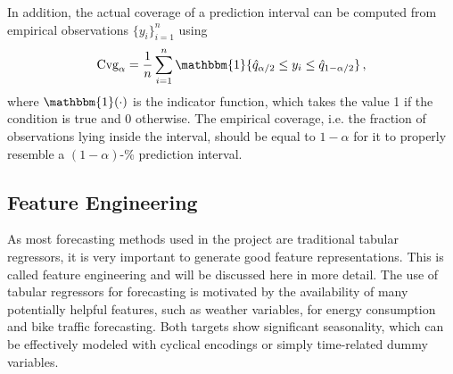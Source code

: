 In addition, the actual coverage of a prediction interval can be computed from empirical observations $\{y_i\}_{i=1}^{n}$ using
\begin{equation}
    \text{Cvg}_{\alpha} = \frac{1}{n} \sum_{i = 1}^{n} \mathbbm{1}\{ \hat{q}_{\alpha/2} \leq y_i \leq \hat{q}_{1 - \alpha /2 } \} \,,
\end{equation}
where $\mathbbm{1}(\cdot)$ is the indicator function, which takes the value 1 if the condition is true and 0 otherwise.
The empirical coverage, i.e. the fraction of observations lying inside the interval, should be equal to $1 - \alpha$ for it to properly resemble a $(1 - \alpha)$-\% prediction interval.


\subsection{Feature Engineering}
\label{sec:Methodology:FeatureEngineering}

As most forecasting methods used in the project are traditional tabular regressors, it is very important to generate good feature representations. This is called feature engineering and will be discussed here in more detail. The use of tabular regressors for forecasting is motivated by the availability of many potentially helpful features, such as weather variables, for energy consumption and bike traffic forecasting. Both targets show significant seasonality, which can be effectively modeled with cyclical encodings or simply time-related dummy variables.  



